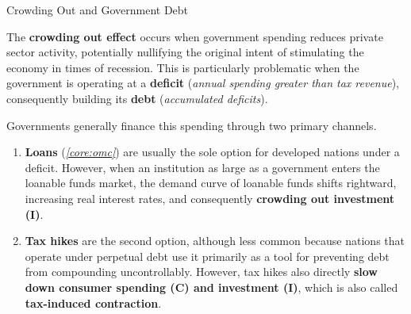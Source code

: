 \documentclass[10pt]{article}
\begin{document}
    \begin{core}{Crowding Out and Government Debt} 

      The \textbf{crowding out effect} occurs when government spending reduces private sector activity, potentially nullifying the original intent of stimulating the economy in times of recession. This is particularly problematic when the government is operating at a \textbf{deficit} (\textit{annual spending greater than tax revenue}), consequently building its \textbf{debt} (\textit{accumulated deficits}).

      Governments generally finance this spending through two primary channels.

      \begin{enumerate}

        \item \textbf{Loans} (\textit{\autoref{core:omc}}) are usually the sole option for developed nations under a deficit. However, when an institution as large as a government enters the loanable funds market, the demand curve of loanable funds shifts rightward, increasing real interest rates, and consequently \textbf{crowding out investment (I)}.


        \item \textbf{Tax hikes} are the second option, although less common because nations that operate under perpetual debt use it primarily as a tool for preventing debt from compounding uncontrollably. However, tax hikes also directly \textbf{slow down consumer spending (C) and investment (I)}, which is also called \textbf{tax-induced contraction}.

      \end{enumerate}

    \end{core}
\end{document}
